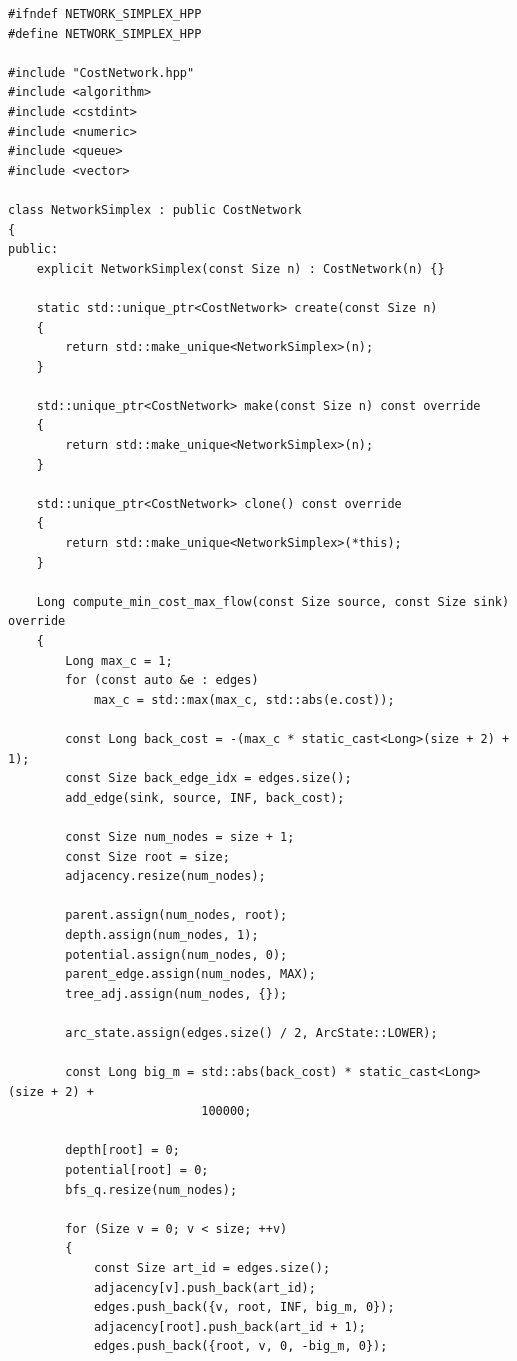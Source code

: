 \newpage

\label{ap:network_simplex}

\begin{lstlisting}[caption={Implementação em C++ do algoritmo \textit{Network Simplex}.}, label={lst:network_simplex}]
#ifndef NETWORK_SIMPLEX_HPP
#define NETWORK_SIMPLEX_HPP

#include "CostNetwork.hpp"
#include <algorithm>
#include <cstdint>
#include <numeric>
#include <queue>
#include <vector>

class NetworkSimplex : public CostNetwork
{
public:
	explicit NetworkSimplex(const Size n) : CostNetwork(n) {}

	static std::unique_ptr<CostNetwork> create(const Size n)
	{
		return std::make_unique<NetworkSimplex>(n);
	}

	std::unique_ptr<CostNetwork> make(const Size n) const override
	{
		return std::make_unique<NetworkSimplex>(n);
	}

	std::unique_ptr<CostNetwork> clone() const override
	{
		return std::make_unique<NetworkSimplex>(*this);
	}

	Long compute_min_cost_max_flow(const Size source, const Size sink) override
	{
		Long max_c = 1;
		for (const auto &e : edges)
			max_c = std::max(max_c, std::abs(e.cost));

		const Long back_cost = -(max_c * static_cast<Long>(size + 2) + 1);
		const Size back_edge_idx = edges.size();
		add_edge(sink, source, INF, back_cost);

		const Size num_nodes = size + 1;
		const Size root = size;
		adjacency.resize(num_nodes);

		parent.assign(num_nodes, root);
		depth.assign(num_nodes, 1);
		potential.assign(num_nodes, 0);
		parent_edge.assign(num_nodes, MAX);
		tree_adj.assign(num_nodes, {});

		arc_state.assign(edges.size() / 2, ArcState::LOWER);

		const Long big_m = std::abs(back_cost) * static_cast<Long>(size + 2) +
		                   100000;

		depth[root] = 0;
		potential[root] = 0;
		bfs_q.resize(num_nodes);

		for (Size v = 0; v < size; ++v)
		{
			const Size art_id = edges.size();
			adjacency[v].push_back(art_id);
			edges.push_back({v, root, INF, big_m, 0});
			adjacency[root].push_back(art_id + 1);
			edges.push_back({root, v, 0, -big_m, 0});


\end{lstlisting}
